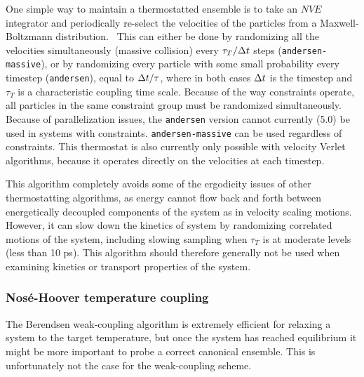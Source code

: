 \subsubsection{}
One simple way to maintain a thermostatted ensemble is to take an
$NVE$ integrator and periodically re-select the velocities of the
particles from a Maxwell-Boltzmann distribution.~\cite{Andersen80}
This can either be done by randomizing all the velocities
simultaneously (massive collision) every $\tau_T/{\Delta t}$ steps ({\tt andersen-massive}), or by
randomizing every particle with some small probability every timestep ({\tt andersen}),
equal to ${\Delta t}/\tau$, where in both cases ${\Delta t}$ is the timestep and
$\tau_T$ is a characteristic coupling time scale.
Because of the way constraints operate, all particles in the same
constraint group must be randomized simultaneously.  Because of
parallelization issues, the {\tt andersen} version cannot currently (5.0) be
used in systems with constraints. {\tt andersen-massive} can be used regardless of constraints.
This thermostat is also currently only possible with velocity Verlet algorithms,
because it operates directly on the velocities at each timestep.

This algorithm completely avoids some of the ergodicity issues of other thermostatting
algorithms, as energy cannot flow back and forth between energetically
decoupled components of the system as in velocity scaling motions.
However, it can slow down the kinetics of system by randomizing
correlated motions of the system, including slowing sampling when
$\tau_T$ is at moderate levels (less than 10 ps). This algorithm
should therefore generally not be used when examining kinetics or
transport properties of the system.~\cite{Basconi2013}

\subsubsection{Nos{\'e}-Hoover temperature coupling}

The Berendsen weak-coupling algorithm is
extremely efficient for relaxing a system to the target temperature,
but once the system has reached equilibrium it might be more
important to probe a correct canonical ensemble. This is unfortunately
not the case for the weak-coupling scheme.

